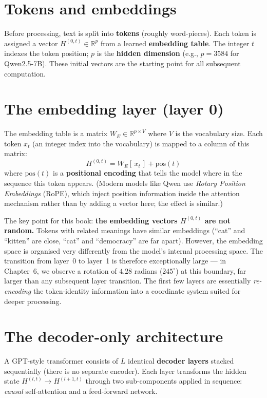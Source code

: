 \documentclass[11pt, twoside, openright]{memoir}
\numberwithin{equation}{chapter}
\begin{document}
\section{Tokens and embeddings}

Before processing, text is split into \textbf{tokens} (roughly
word-pieces).  Each token is assigned a vector $H^{(0,t)} \in
\mathbb{R}^p$ from a learned \textbf{embedding table}.  The integer
$t$ indexes the token position; $p$ is the \textbf{hidden dimension}
(e.g., $p = 3584$ for Qwen2.5-7B).  These initial vectors are the
starting point for all subsequent computation.

\section{The embedding layer (layer 0)}

The embedding table is a matrix $W_E \in \mathbb{R}^{p \times V}$
where $V$ is the vocabulary size.  Each token $x_t$ (an integer index
into the vocabulary) is mapped to a column of this matrix:
\begin{equation}
  H^{(0,t)} = W_E[\,x_t\,] + \mathrm{pos}(t)
\end{equation}
where $\mathrm{pos}(t)$ is a \textbf{positional encoding} that tells
the model where in the sequence this token appears.  (Modern models
like Qwen use \emph{Rotary Position Embeddings} (RoPE), which inject
position information inside the attention mechanism rather than by
adding a vector here; the effect is similar.)

The key point for this book: \textbf{the embedding vectors
$H^{(0,t)}$ are not random.}  Tokens with related meanings have
similar embeddings (``cat'' and ``kitten'' are close, ``cat'' and
``democracy'' are far apart).  However, the embedding space is
organised very differently from the model's internal processing
space.  The transition from layer~0 to layer~1 is therefore
exceptionally large --- in Chapter~6, we observe a rotation of
$4.28$ radians ($245^\circ$) at this boundary, far larger than any
subsequent layer transition.  The first few layers are essentially
\emph{re-encoding} the token-identity information into a coordinate
system suited for deeper processing.

\section{The decoder-only architecture}

A GPT-style transformer consists of $L$ identical \textbf{decoder
layers} stacked sequentially (there is no separate encoder).
Each layer transforms the hidden state $H^{(l,t)} \to H^{(l+1,t)}$
through two sub-components applied in sequence: \emph{causal}
self-attention and a feed-forward network.
\end{document}
